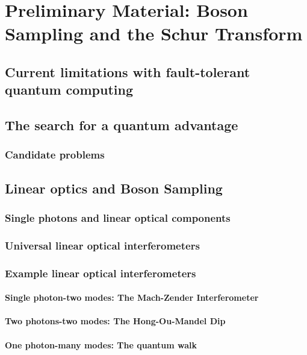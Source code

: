 \chapter{Preliminary Material: Boson Sampling and the Schur Transform}

\section{Current limitations with fault-tolerant quantum computing}

\section{The search for a quantum advantage}

\subsection{Candidate problems}

\section{Linear optics and Boson Sampling}

\subsection{Single photons and linear optical components}

\subsection{Universal linear optical interferometers}

\subsection{Example linear optical interferometers}

\subsubsection{Single photon-two modes: The Mach-Zender Interferometer}

\subsubsection{Two photons-two modes: The Hong-Ou-Mandel Dip}

\subsubsection{One photon-many modes: The quantum walk}

